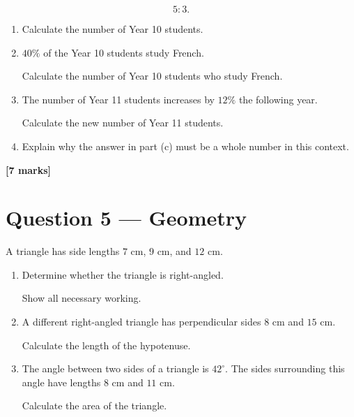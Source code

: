 	\[
	5:3.
	\]
	
	\begin{enumerate}
		\item[(a)] Calculate the number of Year 10 students.
		
		\vspace{15mm}
		
		\item[(b)] \(40\%\) of the Year 10 students study French.
		
		Calculate the number of Year 10 students who study French.
		
		\vspace{15mm}
		
		\item[(c)] The number of Year 11 students increases by \(12\%\) the following year.
		
		Calculate the new number of Year 11 students.
		
		\vspace{15mm}
		
		\item[(d)] Explain why the answer in part (c) must be a whole number in this context.
	\end{enumerate}
	
	\vfill
	
	\noindent
	\textbf{[7 marks]}
	
	\newpage
	
	
	\section*{Question 5 --- Geometry}
	
	A triangle has side lengths \(7\text{ cm}\), \(9\text{ cm}\), and \(12\text{ cm}\).
	
	\begin{enumerate}
		\item[(a)] Determine whether the triangle is right-angled.
		
		Show all necessary working.
		
		\vspace{20mm}
		
		\item[(b)] A different right-angled triangle has perpendicular sides
		\(8\text{ cm}\) and \(15\text{ cm}\).
		
		Calculate the length of the hypotenuse.
		
		\vspace{15mm}
		
		\item[(c)] The angle between two sides of a triangle is \(42^\circ\).
		The sides surrounding this angle have lengths \(8\text{ cm}\) and
		\(11\text{ cm}\).
		
		Calculate the area of the triangle.
	\end{enumerate}
	
